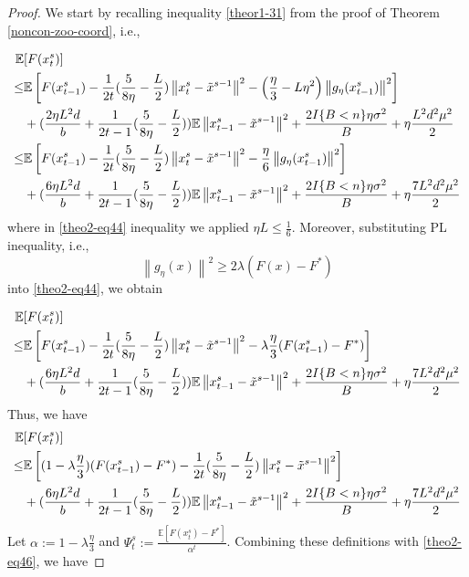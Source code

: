 \documentclass{article}
\newcommand*{\E}{\mathbb{E}}
\newcommand{\norm}[1]{\left\lVert#1\right\rVert}
\theoremstyle{definition}
\theoremstyle{remark}
\begin{document}
\begin{proof}
We start by recalling inequality \eqref{theor1-31} from the proof of Theorem \ref{noncon-zoo-coord}, i.e.,

{\color{Brown}
\begin{align} 
\E&[F({x}_{t}^s)] \notag
\\ \leq& \E\left[F({x}_{t-1}^s)  -\frac{1}{2t}(\frac{5}{8\eta} - \frac{L}{2})\norm{{x}_t^s-\tilde{x}^{s-1}}^2- \left(\frac{\eta}{3}-L\eta^2\right)\norm{g_{\eta}(x_{t-1}^s)}^2\right]\notag\\
&+(\frac{2\eta L^2 d}{b}+\frac{1}{2t-1}(\frac{5}{8\eta} - \frac{L}{2}))\E\norm{x_{t-1}^s-\tilde{x}^{s-1}}^2
+ \frac{2I\{B < n\}\eta \sigma ^2}{B}+\eta \frac{L^2 d^2 \mu^2}{2}\notag
\\ \leq& \E\left[F({x}_{t-1}^s)  -\frac{1}{2t}(\frac{5}{8\eta} - \frac{L}{2})\norm{{x}_t^s-\tilde{x}^{s-1}}^2- \frac{\eta}{6}\norm{g_{\eta}(x_{t-1}^s)}^2\right]\notag\\
&+(\frac{6\eta L^2 d}{b}+\frac{1}{2t-1}(\frac{5}{8\eta} - \frac{L}{2}))\E\norm{x_{t-1}^s-\tilde{x}^{s-1}}^2
+ \frac{2I\{B < n\}\eta \sigma ^2}{B}+\eta \frac{7 L^2 d^2 \mu^2}{2}\label{theo2-eq44}
 \end{align}
 where in \eqref{theo2-eq44} inequality we applied $\eta L \leq \frac{1}{6}$.
 }
Moreover, substituting PL inequality, i.e., 
\begin{equation}
\norm{g_{\eta}(x)}^2 \geq 2\lambda (F(x) - F^*)
\end{equation}
into \eqref{theo2-eq44}, we obtain

{\color{Brown}
\begin{align} 
\E&[F({x}_{t}^s)] \notag
\\ \leq& \E\left[F({x}_{t-1}^s)  -\frac{1}{2t}(\frac{5}{8\eta} - \frac{L}{2})\norm{{x}_t^s-\tilde{x}^{s-1}}^2- \lambda\frac{\eta}{3}(F({x}_{t-1}^s) - F^*) \right]\notag\\
&+(\frac{6\eta L^2 d}{b}+\frac{1}{2t-1}(\frac{5}{8\eta} - \frac{L}{2}))\E\norm{x_{t-1}^s-\tilde{x}^{s-1}}^2
+ \frac{2I\{B < n\}\eta \sigma ^2}{B}+\eta \frac{7 L^2 d^2 \mu^2}{2}
 \end{align}
 }
Thus, we have
{\color{Brown}
\begin{align} 
\E&[F({x}_{t}^s)] \notag
\\ \leq& \E\left[ (1-\lambda\frac{\eta}{3})(F({x}_{t-1}^s) - F^*)   -\frac{1}{2t}(\frac{5}{8\eta} - \frac{L}{2})\norm{{x}_t^s-\tilde{x}^{s-1}}^2\right]\notag\\
&+(\frac{6 \eta L^2 d}{b}+\frac{1}{2t-1}(\frac{5}{8\eta} - \frac{L}{2}))\E\norm{x_{t-1}^s-\tilde{x}^{s-1}}^2
+ \frac{2I\{B < n\}\eta \sigma ^2}{B}+\eta \frac{7 L^2 d^2 \mu^2}{2}\label{theo2-eq46}
 \end{align}
 }
Let {\color{Brown}$\alpha := 1 - \lambda\frac{\eta}{3}$} and $\Psi_t^s := \frac{\E[F({x}_{t}^s)-F^*]}{\alpha^t}$. Combining these definitions with \eqref{theo2-eq46}, we have  


\end{proof}
\end{document}
